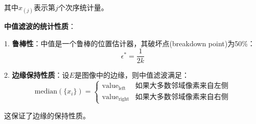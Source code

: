 \documentclass[a4paper,12pt]{ctexart}
\begin{document}
其中$x_{(j)}$表示第$j$个次序统计量。

\textbf{中值滤波的统计性质}：

1. \textbf{鲁棒性}：中值是一个鲁棒的位置估计器，其破坏点(breakdown point)为50\%：
\begin{equation}
\epsilon^* = \frac{1}{2k}
\end{equation}

2. \textbf{边缘保持性质}：设$E$是图像中的边缘，则中值滤波满足：
\begin{equation}
\text{median}(\{x_i\}) = \begin{cases}
\text{value}_{\text{left}} & \text{如果大多数邻域像素来自左侧} \\
\text{value}_{\text{right}} & \text{如果大多数邻域像素来自右侧}
\end{cases}
\end{equation}

这保证了边缘的保持性质。
\end{document}
